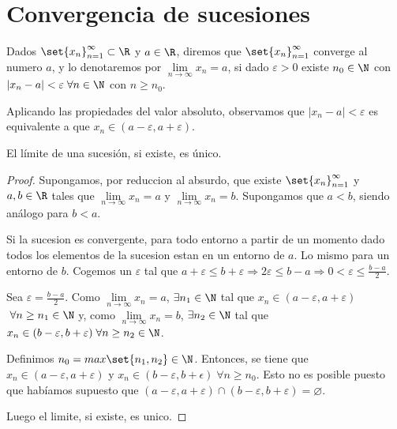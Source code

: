 \section{Convergencia de sucesiones}
\begin{definition}
	Dados \(\set{x_n}^{\infty}_{n=1 } \subset \R 	 \) y \(a \in \R \), diremos que \(\set{x_n}^{\infty}_{n = 1 } \) converge al numero \(a \), y lo denotaremos por \(\lim\limits_{n \to \infty} x_n = a \), si dado \(\varepsilon > 0 \) existe \(n_0 \in \N \) con \(|x_n - a| < \varepsilon \; \forall n \in \N \) con \(n \geq n_0 \).
	
\end{definition}
\begin{remark}
	Aplicando las propiedades del valor absoluto, observamos que \(|x_n - a | < \varepsilon\) es equivalente a que \(x_n \in (a - \varepsilon, a + \varepsilon)\).
\end{remark}
\begin{proposition}
	El límite de una sucesión, si existe, es único.
\end{proposition}
\begin{proof}
	Supongamos, por reduccion al absurdo, que existe \(\set{x_n}^{\infty}_{n = 1} \) y \(a,b \in \R \) tales que \(\lim\limits_{n \to \infty} x_n = a \) y \(\lim\limits_{n \to \infty} x_n = b \). Supongamos que \(a < b \), siendo análogo para \(b < a \).
	
	Si la sucesion es convergente, para todo entorno a partir de un momento dado todos los elementos de la sucesion estan en un entorno de \(a \). Lo mismo para un entorno de \(b \). Cogemos un \(\varepsilon\) tal que \(a + \varepsilon \leq b + \varepsilon \Rightarrow 2\varepsilon \leq b - a \Rightarrow 0 < \varepsilon \leq \frac{b-a}{ 2}\).
	
	Sea \(\varepsilon = \frac{b-a }{2 }\). Como \(\lim\limits_{n  \to \infty} x_n = a \),  \(\exists n_1 \in \N \) tal que \(x_n \in (a - \varepsilon, a + \varepsilon)\) \( \; \forall n \geq  n_{1} \in \N \) y, como \(\lim\limits_{n \to \infty} x_n = b \),  \( \exists n_2 \in  \N \) tal que \(x_n \in (b - \varepsilon, b + \varepsilon) \; \forall n \geq  n_2 \in \N\). 
	
	Definimos \(n_0 = max\set{n_1,n_2} \in \N \). Entonces, se tiene que \(x_n \in (a - \varepsilon, a + \varepsilon)\) y \(x_n \in (b - \varepsilon, b + \epsilon) \; \forall n \geq n_0\). Esto no es posible puesto que habíamos supuesto que \((a - \varepsilon, a + \varepsilon) \cap (b - \varepsilon, b + \varepsilon) = \varnothing \).
	
	Luego el limite, si existe, es unico.
\end{proof}

